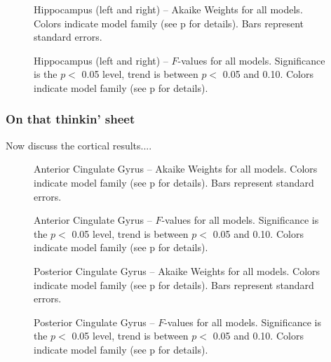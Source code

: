 \documentclass[doc,12pt]{apa}        %
\begin{document}
\begin{figure}[tp]
    \centering
    \caption{Hippocampus (left and right) -- Akaike Weights for all models.  Colors indicate model family (see p\pageref{sub:cmb} for details). Bars represent standard errors.}
	\label{fig:hippocampus}
\end{figure}
\begin{figure}[tp]
    \centering
    \caption{Hippocampus (left and right) -- $F$-values for all models.  Significance is the $p <$ 0.05 level, trend is between $p <$ 0.05 and 0.10.  Colors indicate model family (see p\pageref{sub:cmb} for details).}
	\label{fig:fvalhippocampus}
\end{figure}

\subsubsection{On that thinkin' sheet}
\label{subsub:onsheet}
Now discuss the cortical results....

\clearpage
\begin{figure}[tp]
    \centering
    \caption{Anterior Cingulate Gyrus -- Akaike Weights for all models.  Colors indicate model family (see p\pageref{sub:cmb} for details). Bars represent standard errors.}
	\label{fig:ant}
\end{figure}
\begin{figure}[tp]
    \centering
    \caption{Anterior Cingulate Gyrus -- $F$-values for all models.  Significance is the $p <$ 0.05 level, trend is between $p <$ 0.05 and 0.10.  Colors indicate model family (see p\pageref{sub:cmb} for details).}
	\label{fig:fvalant}
\end{figure}


\begin{figure}[tp]
    \centering
    \caption{Posterior Cingulate Gyrus -- Akaike Weights for all models.  Colors indicate model family (see p\pageref{sub:cmb} for details). Bars represent standard errors.}
	\label{fig:post}
\end{figure}
\begin{figure}[tp]
    \centering
    \caption{Posterior Cingulate Gyrus -- $F$-values for all models.  Significance is the $p <$ 0.05 level, trend is between $p <$ 0.05 and 0.10.  Colors indicate model family (see p\pageref{sub:cmb} for details).}
	\label{fig:fvalpost}
\end{figure}
\end{document}

